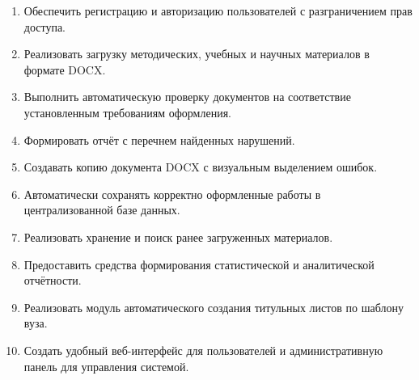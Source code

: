 \begin{enumerate}
	\item Обеспечить регистрацию и авторизацию пользователей с разграничением прав доступа.
	\item Реализовать загрузку методических, учебных и научных материалов в формате DOCX.
	\item Выполнить автоматическую проверку документов на соответствие установленным требованиям оформления.
	\item Формировать отчёт с перечнем найденных нарушений.
	\item Создавать копию документа DOCX с визуальным выделением ошибок.
	\item Автоматически сохранять корректно оформленные работы в централизованной базе данных.
	\item Реализовать хранение и поиск ранее загруженных материалов.
	\item Предоставить средства формирования статистической и аналитической отчётности.
	\item Реализовать модуль автоматического создания титульных листов по шаблону вуза.
	\item Создать удобный веб-интерфейс для пользователей и административную панель для управления системой.
\end{enumerate}